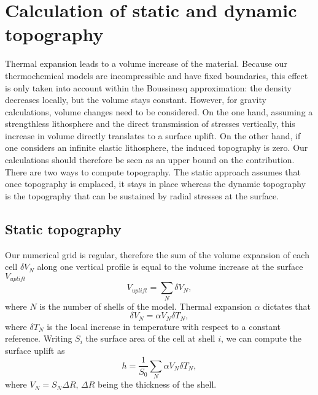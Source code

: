 
\section{Calculation of static and dynamic topography}

Thermal expansion leads to a volume increase of the material. Because our thermochemical models are
incompressible and have fixed boundaries, this effect is only taken into account within the
Boussinesq approximation: the density decreases locally, but the volume stays constant. However, for
gravity calculations, volume changes need to be considered. On the one hand, assuming a strengthless
lithosphere and the direct transmission of stresses vertically, this increase in volume directly
translates to a surface uplift. On the other hand, if one considers an infinite elastic lithosphere,
the induced topography is zero. Our calculations should therefore be seen as an upper bound on the
contribution. There are two ways to compute topography. The static approach assumes that once topography
is emplaced, it stays in place whereas the dynamic topography is the topography that can be sustained
by radial stresses at the surface.

\subsection*{Static topography}

Our numerical grid is regular, therefore the sum of the volume expansion of each cell $\delta V_N$
along one vertical profile is equal to the volume increase at the surface $V_{uplift}$
%
\begin{equation} V_{uplift} = \sum_N \delta V_N, \end{equation} 
%
where $N$ is the number of shells of the model. Thermal expansion $\alpha$ dictates that
%
\begin{equation} \delta V_N = \alpha V_N \delta T_N, \end{equation}
%
where $\delta T_N$ is the local increase in temperature with respect to a constant reference.
Writing $S_i$ the surface area of the cell at shell $i$, we can compute the surface uplift as
%
\begin{equation} h=\frac{1}{S_0} \sum_N \alpha V_N \delta T_N, \end{equation}
%
where $V_N = S_N \Delta R$, $\Delta R$ being the thickness of the shell.


